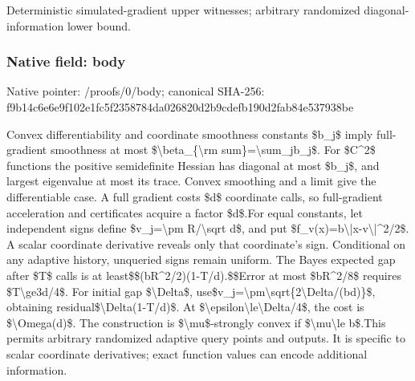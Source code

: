 \documentclass[10pt,a4paper]{article}
\begin{document}
\begingroup\raggedright\sloppy Deterministic simulated-gradient upper witnesses;\allowbreak{} arbitrary randomized diagonal-information lower bound.\par\endgroup

\subsubsection{Native field: body}
Native pointer: /proofs/0/body; canonical SHA-256: f9b14c6e6e9f102e1fc5f2358784da026820d2b9cdefb190d2fab84e537938be

\begingroup\raggedright\sloppy Convex differentiability and coordinate smoothness constants \$b\_\allowbreak{}j\$ imply full-gradient smoothness at most \$\textbackslash{}beta\_\allowbreak{}\{\textbackslash{}rm sum\}=\allowbreak{}\textbackslash{}sum\_\allowbreak{}jb\_\allowbreak{}j\$. For \$C\textasciicircum{}2\$ functions the positive semidefinite Hessian has diagonal at most \$b\_\allowbreak{}j\$,\allowbreak{} and largest eigenvalue at most its trace. Convex smoothing and a limit give the differentiable case. A full gradient costs \$d\$ coordinate calls,\allowbreak{} so full-gradient acceleration and certificates acquire a factor \$d\$.\newline{}\newline{}For equal constants,\allowbreak{} let independent signs define \$v\_\allowbreak{}j=\allowbreak{}\textbackslash{}pm R/\allowbreak{}\textbackslash{}sqrt d\$,\allowbreak{} and put \$f\_\allowbreak{}v(x)=\allowbreak{}b\textbackslash{}|x-v\textbackslash{}|\textasciicircum{}2/\allowbreak{}2\$. A scalar coordinate derivative reveals only that coordinate's sign. Conditional on any adaptive history,\allowbreak{} unqueried signs remain uniform. The Bayes expected gap after \$T\$ calls is at least\newline{}\$\$\newline{}(bR\textasciicircum{}2/\allowbreak{}2)(1-T/\allowbreak{}d).\newline{}\$\$\newline{}Error at most \$bR\textasciicircum{}2/\allowbreak{}8\$ requires \$T\textbackslash{}ge3d/\allowbreak{}4\$. For initial gap \$\textbackslash{}Delta\$,\allowbreak{} use\newline{}\$v\_\allowbreak{}j=\allowbreak{}\textbackslash{}pm\textbackslash{}sqrt\{2\textbackslash{}Delta/\allowbreak{}(bd)\}\$,\allowbreak{} obtaining residual\newline{}\$\textbackslash{}Delta(1-T/\allowbreak{}d)\$. At \$\textbackslash{}epsilon\textbackslash{}le\textbackslash{}Delta/\allowbreak{}4\$,\allowbreak{} the cost is \$\textbackslash{}Omega(d)\$. The construction is \$\textbackslash{}mu\$-strongly convex if \$\textbackslash{}mu\textbackslash{}le b\$.\newline{}\newline{}This permits arbitrary randomized adaptive query points and outputs. It is specific to scalar coordinate derivatives;\allowbreak{} exact function values can encode additional information.\par\endgroup
\end{document}
